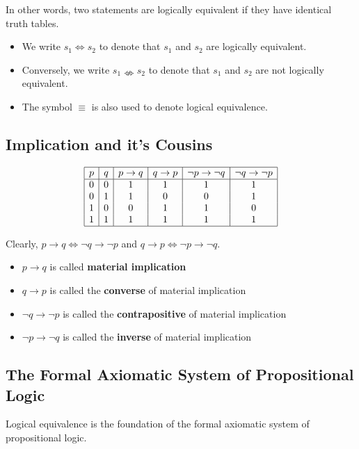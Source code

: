 \documentclass[12pt]{article}
\begin{document}
In other words, two statements are logically equivalent if they have identical
truth tables.

\begin{itemize}
\item We write $s_1 \Leftrightarrow s_2$ to denote that $s_1$ and $s_2$ are
  logically equivalent.
\item Conversely, we write $s_1 \nLeftrightarrow s_2$ to denote that $s_1$
  and $s_2$ are not logically equivalent.
\item The symbol $\equiv$ is also used to denote logical equivalence.
\end{itemize}


\subsection{Implication and it's Cousins}

\[
\begin{array}{|c|c|c|c|c|c|}
\hline
p & q & p \to q & q \to p & \neg p \to \neg q & \neg q \to \neg p \\
\hline
0 & 0 & 1 & 1 & 1 & 1 \\
0 & 1 & 1 & 0 & 0 & 1 \\
1 & 0 & 0 & 1 & 1 & 0 \\
1 & 1 & 1 & 1 & 1 & 1 \\
\hline
\end{array}
\]

Clearly, $p \to q \Leftrightarrow \neg q \to \neg p$ and 
$q \to p \Leftrightarrow \neg p \to \neg q$.

\begin{itemize}
\item $p \to q$ is called \textbf{material implication}
\item $q \to p$ is called the \textbf{converse} of material implication
\item $\neg q \to \neg p$ is called the \textbf{contrapositive} of material
  implication
\item $\neg p \to \neg q$ is called the \textbf{inverse} of material
  implication
\end{itemize}

\subsection{The Formal Axiomatic System of Propositional Logic}

Logical equivalence is the foundation of the formal axiomatic system of
propositional logic.
\end{document}

